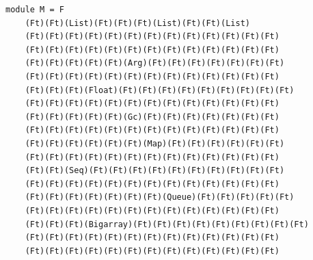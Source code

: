 \documentclass[11pt,aspectratio=169]{beamer}
\begin{document}
  \begin{frame}[fragile]
  \begin{verbatim}
module M = F
    (Ft)(Ft)(List)(Ft)(Ft)(Ft)(List)(Ft)(Ft)(List)
    (Ft)(Ft)(Ft)(Ft)(Ft)(Ft)(Ft)(Ft)(Ft)(Ft)(Ft)(Ft)(Ft)
    (Ft)(Ft)(Ft)(Ft)(Ft)(Ft)(Ft)(Ft)(Ft)(Ft)(Ft)(Ft)(Ft)
    (Ft)(Ft)(Ft)(Ft)(Ft)(Arg)(Ft)(Ft)(Ft)(Ft)(Ft)(Ft)(Ft)
    (Ft)(Ft)(Ft)(Ft)(Ft)(Ft)(Ft)(Ft)(Ft)(Ft)(Ft)(Ft)(Ft)
    (Ft)(Ft)(Ft)(Float)(Ft)(Ft)(Ft)(Ft)(Ft)(Ft)(Ft)(Ft)(Ft)
    (Ft)(Ft)(Ft)(Ft)(Ft)(Ft)(Ft)(Ft)(Ft)(Ft)(Ft)(Ft)(Ft)
    (Ft)(Ft)(Ft)(Ft)(Ft)(Gc)(Ft)(Ft)(Ft)(Ft)(Ft)(Ft)(Ft)
    (Ft)(Ft)(Ft)(Ft)(Ft)(Ft)(Ft)(Ft)(Ft)(Ft)(Ft)(Ft)(Ft)
    (Ft)(Ft)(Ft)(Ft)(Ft)(Ft)(Map)(Ft)(Ft)(Ft)(Ft)(Ft)(Ft)
    (Ft)(Ft)(Ft)(Ft)(Ft)(Ft)(Ft)(Ft)(Ft)(Ft)(Ft)(Ft)(Ft)
    (Ft)(Ft)(Seq)(Ft)(Ft)(Ft)(Ft)(Ft)(Ft)(Ft)(Ft)(Ft)(Ft)
    (Ft)(Ft)(Ft)(Ft)(Ft)(Ft)(Ft)(Ft)(Ft)(Ft)(Ft)(Ft)(Ft)
    (Ft)(Ft)(Ft)(Ft)(Ft)(Ft)(Ft)(Queue)(Ft)(Ft)(Ft)(Ft)(Ft)
    (Ft)(Ft)(Ft)(Ft)(Ft)(Ft)(Ft)(Ft)(Ft)(Ft)(Ft)(Ft)(Ft)
    (Ft)(Ft)(Ft)(Bigarray)(Ft)(Ft)(Ft)(Ft)(Ft)(Ft)(Ft)(Ft)(Ft)
    (Ft)(Ft)(Ft)(Ft)(Ft)(Ft)(Ft)(Ft)(Ft)(Ft)(Ft)(Ft)(Ft)
    (Ft)(Ft)(Ft)(Ft)(Ft)(Ft)(Ft)(Ft)(Ft)(Ft)(Ft)(Ft)(Ft)
\end{verbatim}
\end{frame}
\end{document}
